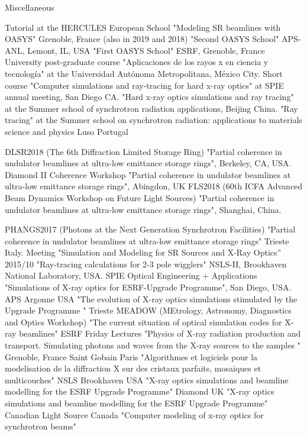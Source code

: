 \begin{rubric}{Miscellaneous }


\entry*[2021]Tutorial at the HERCULES European School "Modeling SR beamlines with OASYS" Grenoble, France (also in 2019 and 2018)
\entry*[2019/12]"Second OASYS School" APS-ANL, Lemont, IL, USA
\entry*[2019/05]"First OASYS School" ESRF, Grenoble, France
\entry*[2002]University post-graduate course "Aplicaciones de los rayos x en ciencia y tecnología" at the Universidad
Aut\'onoma Metropolitana, M\'exico City.
\entry*[2001]Short course "Computer simulations and ray-tracing for hard x-ray optics" at SPIE annual
meeting, San Diego CA.
\entry*[2001]"Hard x-ray optics simulations and ray tracing" at the Summer school of synchrotron radiation applications, Beijing China.
\entry*[1998]"Ray tracing" at the Summer school on synchrotron radiation: applications to materials science and physics Luso Portugal




\entry*[2018/10] DLSR2018 (The 6th Diffraction Limited Storage Ring) "Partial coherence in undulator beamlines at ultra-low emittance storage rings", Berkeley, CA, USA.
\entry*[2018/05] Diamond II Coherence Workshop "Partial coherence in undulator beamlines at ultra-low emittance storage rings", Abingdon, UK
\entry*[2018/03] FLS2018 (60th ICFA Advanced Beam Dynamics Workshop on
Future Light Sources) "Partial coherence in undulator beamlines at ultra-low emittance storage rings", Shanghai, China.

\entry*[2017] PHANGS2017 (Photons at the Next Generation Synchrotron Facilities) "Partial coherence in undulator beamlines at ultra-low emittance storage rings" Trieste Italy.
\entry*[2015] Meeting "Simulation and Modeling for SR Sources and X-Ray Optics” 2015/10 "Ray-tracing calculations for 2-3 pole wigglers" NSLS-II, Brookhaven National Laboratory, USA.
\entry*[2014] SPIE Optical Engineering + Applications "Simulations of X-ray optics for ESRF-Upgrade Programme", San Diego, USA.
\entry*[2014] APS Argonne USA "The evolution of X-ray optics simulations stimulated by the Upgrade Programme
"
\entry*[2013] Trieste MEADOW (MEtrology, Astronomy, Diagnostics and Optics Workshop) "The current situation of optical simulation codes for X-ray beamlines"
\entry*[2011] 
\entry*[2011] ESRF Friday Lectures "Physics of X-ray radiation production and transport. Simulating photons and waves from the X-ray sources to the samples " Grenoble, France
\entry*[2011] Saint Gobain Paris "Algorithmes et logiciels pour la modelisation de la diffraction X sur des cristaux parfaits, mosaiques et multicouches"
\entry*[2010] NSLS Brookhaven USA "X-ray optics simulations and beamline modelling for the ESRF Upgrade Programme"
\entry*[2009] Diamond UK "X-ray optics simulations and beamline modelling for the ESRF Upgrade Programme"
\entry*[2006] Canadian Light Source Canada "Computer modeling of x-ray optics for synchrotron beams"



\end{rubric}
